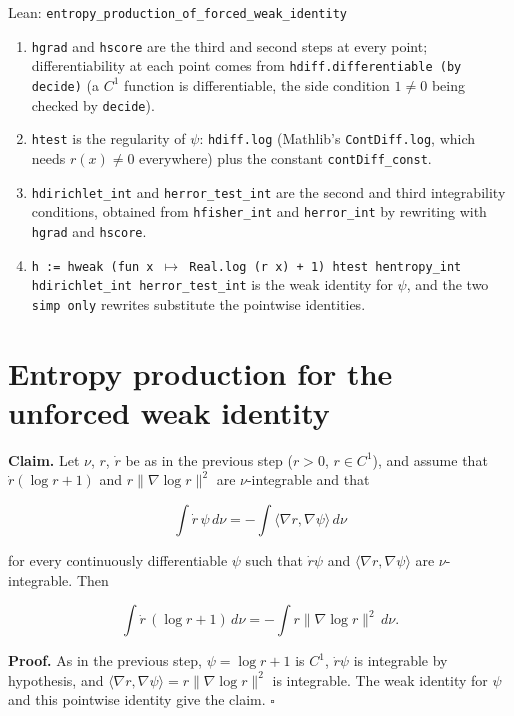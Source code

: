 \documentclass[11pt,a4paper]{article}
\begin{document}
\begin{leanbox}{Lean: \texttt{entropy\_\allowbreak{}production\_\allowbreak{}of\_\allowbreak{}forced\_\allowbreak{}weak\_\allowbreak{}identity}}
\begin{enumerate}
\item \texttt{hgrad} and \texttt{hscore} are the third and second steps at every point; differentiability at each point comes from \texttt{hdiff.\allowbreak{}differentiable (by decide)} (a \(C^1\) function is differentiable, the side condition \(1\neq0\) being checked by \texttt{decide}).

\item \texttt{htest} is the regularity of \(\psi\): \texttt{hdiff.\allowbreak{}log} (Mathlib's \texttt{Cont\allowbreak{}Diff.\allowbreak{}log}, which needs \(r(x)\neq0\) everywhere) plus the constant \texttt{cont\allowbreak{}Diff\_\allowbreak{}const}.

\item \texttt{hdirichlet\_\allowbreak{}int} and \texttt{herror\_\allowbreak{}test\_\allowbreak{}int} are the second and third integrability conditions, obtained from \texttt{hfisher\_\allowbreak{}int} and \texttt{herror\_\allowbreak{}int} by rewriting with \texttt{hgrad} and \texttt{hscore}.

\item \texttt{h := hweak (fun x \ensuremath{\mapsto} Real.\allowbreak{}log (r x) + 1) htest hentropy\_\allowbreak{}int hdirichlet\_\allowbreak{}int herror\_\allowbreak{}test\_\allowbreak{}int} is the weak identity for \(\psi\), and the two \texttt{simp only} rewrites substitute the pointwise identities.

\end{enumerate}
\end{leanbox}

\section{\texorpdfstring{Entropy production for the unforced weak identity}{Entropy production for the unforced weak identity}}


\textbf{Claim.} Let \(\nu\), \(r\), \(\dot r\) be as in the previous step (\(r>0\), \(r\in C^1\)), and assume that \(\dot r(\log r+1)\) and \(r\|\nabla\log r\|^2\) are \(\nu\)-integrable and that


\[\int\dot r\,\psi\,d\nu=-\int\langle\nabla r,\nabla\psi\rangle\,d\nu\]


for every continuously differentiable \(\psi\) such that \(\dot r\psi\) and \(\langle\nabla r,\nabla\psi\rangle\) are \(\nu\)-integrable. Then


\[\int\dot r\,(\log r+1)\,d\nu=-\int r\|\nabla\log r\|^2\,d\nu.\]


\textbf{Proof.} As in the previous step, \(\psi=\log r+1\) is \(C^1\), \(\dot r\psi\) is integrable by hypothesis, and \(\langle\nabla r,\nabla\psi\rangle=r\|\nabla\log r\|^2\) is integrable. The weak identity for \(\psi\) and this pointwise identity give the claim. \(\square\)
\end{document}
